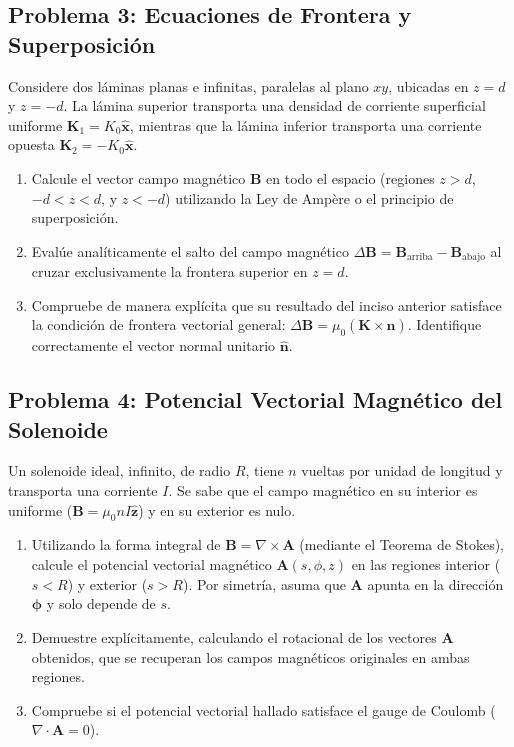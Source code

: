 \documentclass[11pt]{article}
\begin{document}
\subsection*{Problema 3: Ecuaciones de Frontera y Superposición}
Considere dos láminas planas e infinitas, paralelas al plano $xy$, ubicadas en $z = d$ y $z = -d$. La lámina superior transporta una densidad de corriente superficial uniforme $\mathbf{K}_1 = K_0 \hat{\mathbf{x}}$, mientras que la lámina inferior transporta una corriente opuesta $\mathbf{K}_2 = -K_0 \hat{\mathbf{x}}$.
\begin{enumerate}
    \item[a)] Calcule el vector campo magnético $\mathbf{B}$ en todo el espacio (regiones $z > d$, $-d < z < d$, y $z < -d$) utilizando la Ley de Ampère o el principio de superposición.
    \item[b)] Evalúe analíticamente el salto del campo magnético $\Delta \mathbf{B} = \mathbf{B}_{\text{arriba}} - \mathbf{B}_{\text{abajo}}$ al cruzar exclusivamente la frontera superior en $z = d$. 
    \item[c)] Compruebe de manera explícita que su resultado del inciso anterior satisface la condición de frontera vectorial general: $\Delta \mathbf{B} = \mu_0 (\mathbf{K} \times \hat{\mathbf{n}})$. Identifique correctamente el vector normal unitario $\hat{\mathbf{n}}$.
\end{enumerate}


\subsection*{Problema 4: Potencial Vectorial Magnético del Solenoide}
Un solenoide ideal, infinito, de radio $R$, tiene $n$ vueltas por unidad de longitud y transporta una corriente $I$. Se sabe que el campo magnético en su interior es uniforme ($\mathbf{B} = \mu_0 n I \hat{\mathbf{z}}$) y en su exterior es nulo.
\begin{enumerate}
    \item[a)] Utilizando la forma integral de $\mathbf{B} = \nabla \times \mathbf{A}$ (mediante el Teorema de Stokes), calcule el potencial vectorial magnético $\mathbf{A}(s, \phi, z)$ en las regiones interior ($s < R$) y exterior ($s > R$). Por simetría, asuma que $\mathbf{A}$ apunta en la dirección $\hat{\boldsymbol{\phi}}$ y solo depende de $s$.
    \item[b)] Demuestre explícitamente, calculando el rotacional de los vectores $\mathbf{A}$ obtenidos, que se recuperan los campos magnéticos originales en ambas regiones.
    \item[c)] Compruebe si el potencial vectorial hallado satisface el gauge de Coulomb ($\nabla \cdot \mathbf{A} = 0$).
\end{enumerate}
\end{document}
